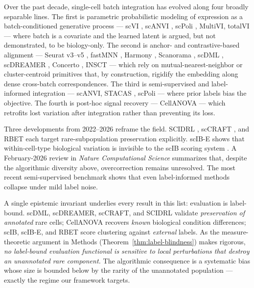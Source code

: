 
Over the past decade, single-cell batch integration has evolved along four broadly separable lines. The first is parametric probabilistic modeling of expression as a batch-conditioned generative process — scVI \citep{lopez2018scvi}, scANVI \citep{xu2021scanvi}, scPoli \citep{hrovatin2023scpoli}, MultiVI, totalVI — where batch is a covariate and the learned latent is argued, but not demonstrated, to be biology-only. The second is anchor- and contrastive-based alignment — Seurat v3--v5 \citep{stuart2019seurat, hao2021seurat}, fastMNN \citep{haghverdi2018mnn}, Harmony \citep{korsunsky2019harmony}, Scanorama \citep{hie2019scanorama}, scDML \citep{yu2023scdml}, scDREAMER \citep{shaham2023scdreamer}, Concerto \citep{yang2022concerto}, INSCT \citep{simon2021insct} — which rely on mutual-nearest-neighbor or cluster-centroid primitives that, by construction, rigidify the embedding along dense cross-batch correspondences. The third is semi-supervised and label-informed integration — scANVI, STACAS \citep{andreatta2024stacas}, scPoli — where prior labels bias the objective. The fourth is post-hoc signal recovery — CellANOVA \citep{li2024cellanova} — which retrofits lost variation after integration rather than preventing its loss.

Three developments from 2022--2026 reframe the field. SCIDRL \citep{wang2022scidrl}, scCRAFT \citep{li2025sccraft}, and RBET \citep{wang2025rbet} each target rare-subpopulation preservation explicitly. scIB-E \citep{xu2025scibe} shows that within-cell-type biological variation is invisible to the scIB scoring system \citep{luecken2022scib}. A February-2026 review in \textit{Nature Computational Science} summarizes that, despite the algorithmic diversity above, overcorrection remains unresolved. The most recent semi-supervised benchmark \citep{plos2025semisupbench} shows that even label-informed methods collapse under mild label noise.

A single epistemic invariant underlies every result in this list: evaluation is label-bound. scDML, scDREAMER, scCRAFT, and SCIDRL validate \emph{preservation of annotated} rare cells; CellANOVA recovers \emph{known} biological condition differences; scIB, scIB-E, and RBET score clustering against \emph{external} labels. As the measure-theoretic argument in Methods (Theorem~\ref{thm:label-blindness}) makes rigorous, \emph{no label-bound evaluation functional is sensitive to local perturbations that destroy an unannotated rare component.} The algorithmic consequence is a systematic bias whose size is bounded below by the rarity of the unannotated population --- exactly the regime our framework targets.


